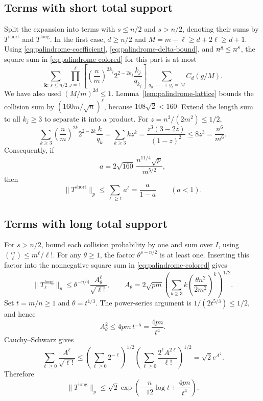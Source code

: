 \subsection{Terms with short total support}

Split the expansion into terms with $s\leq n/2$ and $s>n/2$, denoting
their sums by $T^{\mathrm{short}}$ and $T^{\mathrm{long}}$.  In the
first case, $d\geq n/2$ and
$M=m-\ell\geq d+2\ell\geq d+1$.
Using \eqref{eq:palindrome-coefficient},
\eqref{eq:palindrome-delta-bound}, and $n^{\underline{s}}\leq n^s$, the square
sum in \eqref{eq:palindrome-colored} for this part is at most
\[
  \sum_{\boldsymbol{k}:\,s\leq n/2}
       \prod_{j=1}^{\ell}
          \left[\left(\frac nm\right)^{2k_j}
                       2^{2-2k_j}\frac{k_j}{q_{k_j}}\right]
       \sum_{g_0+\cdots+g_\ell=M}C_d(g/M).
\]
We have also used $(M/m)^{2d}\leq1$.
Lemma~\ref{lem:palindrome-lattice} bounds the collision sum by
$(160m/\sqrt n)^\ell$, because $108\sqrt2<160$.
Extend the length sum to all $k_j\geq3$ to separate it into a product.
For $z=n^2/(2m^2)\leq1/2$,
\[
  \sum_{k\geq3}\left(\frac nm\right)^{2k}
                   2^{2-2k}\frac{k}{q_k}
  =\sum_{k\geq3}kz^k
  =\frac{z^3(3-2z)}{(1-z)^2}
  \leq8z^3=\frac{n^6}{m^6}.
\]
Consequently, if
\[
  a=2\sqrt{160}\,\frac{n^{11/4}\sqrt p}{m^{5/2}},
\]
then
\begin{equation}\label{eq:palindrome-short}
  \|T^{\mathrm{short}}\|_p
  \leq\sum_{\ell\geq1}a^\ell=\frac a{1-a}
  \qquad(a<1).
\end{equation}

\subsection{Terms with long total support}

For $s>n/2$, bound each collision probability by one and sum over $I$,
using $\binom m\ell\leq m^\ell/\ell!$.
For any $\theta\geq1$, the factor $\theta^{s-n/2}$ is at least one.
Inserting this factor into the nonnegative square sum in
\eqref{eq:palindrome-colored} gives
\[
  \|T_\ell^{\mathrm{long}}\|_p
  \leq\theta^{-n/4}\frac{A_\theta^\ell}{\sqrt{\ell!}},
  \qquad
  A_\theta=2\sqrt{pm}
       \left(\sum_{k\geq3}k
                  \left(\frac{\theta n^2}{2m^2}\right)^k\right)^{1/2}.
\]
Set $t=m/n\geq1$ and $\theta=t^{1/3}$.  The power-series argument
is $1/(2t^{5/3})\leq1/2$, and hence
\[
  A_\theta^2\leq4pm\,t^{-5}=\frac{4pn}{t^4}.
\]
Cauchy--Schwarz gives
\[
  \sum_{\ell\geq0}\frac{A^\ell}{\sqrt{\ell!}}
  \leq
  \left(\sum_{\ell\geq0}2^{-\ell}\right)^{1/2}
  \left(\sum_{\ell\geq0}\frac{2^\ell A^{2\ell}}{\ell!}\right)^{1/2}
  =\sqrt2e^{A^2}.
\]
Therefore
\begin{equation}\label{eq:palindrome-long}
  \|T^{\mathrm{long}}\|_p
  \leq\sqrt2\exp\left(-\frac n{12}\log t+\frac{4pn}{t^4}\right).
\end{equation}

